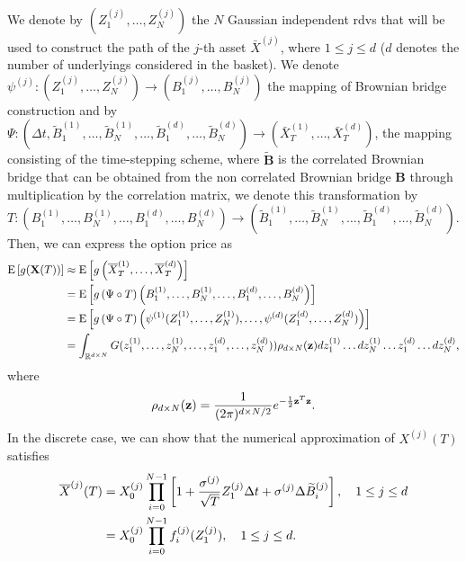 We denote by $(Z_1^{(j)},\dots,Z_N^{(j)})$ the $N$ Gaussian independent rdvs that will be used to construct the path of the $j$-th asset $\bar{X}^{(j)}$, where $1 \le j \le d$ ($d$ denotes the number of underlyings considered in the basket). We denote  $\psi^{(j)}: (Z_1^{(j)},\dots,Z_N^{(j)}) \rightarrow (B_1^{(j)},\dots,B_N^{(j)})$ the mapping of Brownian bridge construction and by $\Psi: (\Delta t, \widetilde{B}^{(1)}_1,\dots,\widetilde{B}^{(1)}_N,\dots, \widetilde{B}^{(d)}_1,\dots,\widetilde{B}^{(d)}_N) \rightarrow \left(\bar{X}^{(1)}_T,\dots,\bar{X}^{(d)}_T \right)$, the mapping consisting of the time-stepping scheme, where $\widetilde{\mathbf{B}}$ is the correlated Brownian bridge that can be obtained from the non correlated Brownian bridge $\mathbf{B}$ through multiplication by the correlation matrix, we denote this transformation by $T: \left(B^{(1)}_1,\dots,B^{(1)}_N,\dots, B^{(d)}_1,\dots,B^{(d)}_N \right) \rightarrow \left(\widetilde{B}^{(1)}_1,\dots,\widetilde{B}^{(1)}_N,\dots, \widetilde{B}^{(d)}_1,\dots,\widetilde{B}^{(d)}_N\right)$. Then, we can express the option price as
\begin{align}\label{eq: option price as integral_basket}
	\mathrm{E}\left[g(\mathbf{X}(T))\right]&\approx	\mathrm{E}\left[g\left(\overline{X}_T^{(1)}, \dots,\overline{X}_T^{(d)} \right)\right] \nonumber\\
	&=\mathrm{E}\left[g\left(\Psi\circ T\right) \left(B^{(1)}_1,\dots,B^{(1)}_N,\dots, B^{(d)}_1,\dots,B^{(d)}_N \right)\right] \nonumber\\
		&=\mathrm{E}\left[g\left(\Psi \circ T \right) \left(\psi^{(1)}(Z_1^{(1)}, \dots, Z_N^{(1)}), \dots, \psi^{(d)}(Z_1^{(d)},\dots,Z^{(d)}_N)\right)\right] \nonumber\\
	&=\int_{\mathbb{R}^{d \times N}} G(z_1^{(1)}, \dots, z_N^{(1)}, \dots, z_1^{(d)},\dots,z^{(d)}_N)) \rho_{d \times N}(\mathbf{z}) dz_1^{(1)} \dots dz_N^{(1)} \dots z_1^{(d)} \dots dz^{(d)}_N ,
\end{align}
where 
\begin{equation*}
\rho_{d \times N}(\mathbf{z})=\frac{1}{(2 \pi)^{{d \times N}/2}} e^{-\frac{1}{2} \mathbf{z}^T \mathbf{z}} .
\end{equation*}
In the discrete case, we can show that the numerical approximation of $X^{(j)}(T)$ satisfies
\begin{align}\label{eq:discrete_rep}
	\overline{X}^{(j)}(T)&=X_0^{(j)} \prod_{i=0}^{N-1} \left[ 1+\frac{\sigma^{(j)}}{\sqrt{T}} Z^{(j)}_1 \Delta t+ \sigma^{(j)} \Delta \widetilde{B}^{(j)}_{i}\right], \quad 1 \le j \le d \nonumber\\
	&= X_0^{(j)} \prod_{i=0}^{N-1} f_i^{(j)}(Z^{(j)}_1) , \quad 1 \le j \le d .
\end{align}
